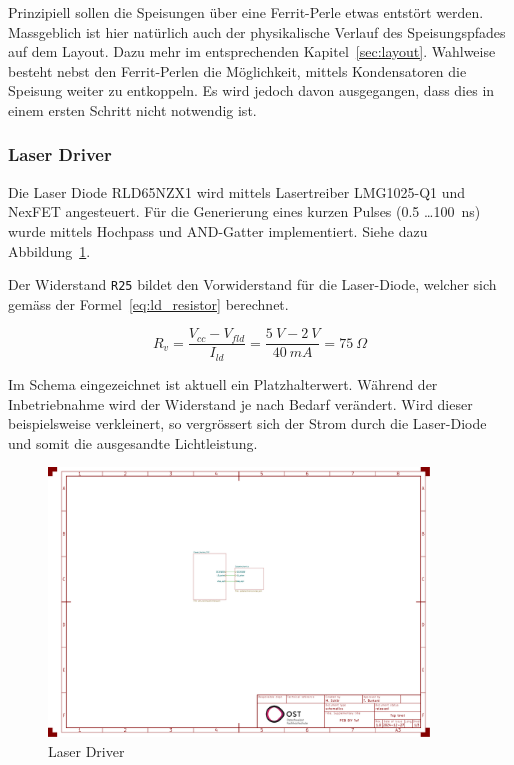 \documentclass[11pt,a4paper,hidelinks]{article}
\begin{document}
Prinzipiell sollen die Speisungen über eine Ferrit-Perle etwas entstört werden. Massgeblich ist hier natürlich auch der
physikalische Verlauf des Speisungspfades auf dem Layout. Dazu mehr im entsprechenden Kapitel~\ref{sec:layout}. Wahlweise
besteht nebst den Ferrit-Perlen die Möglichkeit, mittels Kondensatoren die Speisung weiter zu entkoppeln. Es wird jedoch
davon ausgegangen, dass dies in einem ersten Schritt nicht notwendig ist.

\subsubsection{Laser Driver}

Die Laser Diode RLD65NZX1 \cite{rohm2019rld65nzx1_datasheet} wird mittels Lasertreiber LMG1025-Q1 \cite{ti2024lmg1025q1_datasheet}
und NexFET \cite{ti2016csd17578q3a_datasheet} angesteuert. Für die Generierung eines kurzen Pulses (0.5 \dots 100~ns)
wurde mittels Hochpass und AND-Gatter \cite{diodes202074lvc1g08q_datasheet} implementiert. Siehe dazu Abbildung~\ref{fig:laser_driver}.

Der Widerstand \lstinline|R25| bildet den Vorwiderstand für die Laser-Diode, welcher sich gemäss der Formel~\ref{eq:ld_resistor} berechnet.

\begin{equation}\label{eq:ld_resistor}
    R_{v} = \frac{V_{cc} - V_{fld}}{I_{ld}} = \frac{5~V - 2~V}{40~mA} = 75~\Omega
\end{equation}

Im Schema eingezeichnet ist aktuell ein Platzhalterwert. Während der Inbetriebnahme wird der Widerstand je nach Bedarf
verändert. Wird dieser beispielsweise verkleinert, so vergrössert sich der Strom durch die Laser-Diode und somit die ausgesandte
Lichtleistung.

\begin{figure}[H]
    \centering
    \includegraphics[page=3, trim=100 520 550 60, clip, width=0.9\textwidth]{attachments/schematic.pdf}
    \caption{Laser Driver}\label{fig:laser_driver}
\end{figure}
\end{document}
